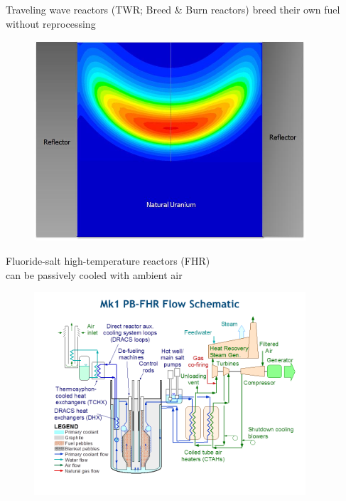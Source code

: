 \documentclass{beamer}
\begin{document}
        \begin{frame}{Traveling wave reactors (TWR; Breed \& Burn reactors) breed their own fuel without reprocessing}
            \begin{figure}
                \centering
                \includegraphics[width=0.9\textwidth]{./img/candle.png}
                \caption*{}
            \end{figure}
        \end{frame}

        \begin{frame}{Fluoride-salt high-temperature reactors (FHR) \\ can be passively cooled with ambient air}
            \begin{figure}
                \centering
                \includegraphics[width=0.9\textwidth]{./img/fhrBop.png}
                \caption*{}
            \end{figure}
        \end{frame}
\end{document}
